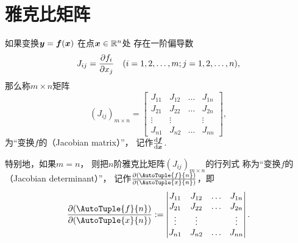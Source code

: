 \section{雅克比矩阵}
\begin{definition}
如果变换\(\boldsymbol{y} = \boldsymbol{f}(\boldsymbol{x})\)
在点\(\boldsymbol{x} \in \mathbb{R}^n\)处
存在一阶偏导数\[
	J_{ij} = \pdv{f_i}{x_j}
	\quad(i=1,2,\dotsc,m; j=1,2,\dotsc,n),
\]
那么称\(m \times n\)矩阵\[
	(J_{ij})_{m \times n}
	= \begin{bmatrix}
		J_{11} & J_{12} & \dots & J_{1n} \\
		J_{21} & J_{22} & \dots & J_{2n} \\
		\vdots & \vdots & & \vdots \\
		J_{n1} & J_{n2} & \dots & J_{nn}
	\end{bmatrix},
\]为“变换\(f\)的（Jacobian matrix）”，
记作\(\dv{\boldsymbol{f}}{\boldsymbol{x}}\).

特别地，如果\(m = n\)，
则把\(n\)阶雅克比矩阵\((J_{ij})_{m \times n}\)的行列式
称为“变换\(f\)的（Jacobian determinant）”，
记作\(\jacobi{\AutoTuple{f}{n}}{\AutoTuple{x}{n}}\)，即\[
	\jacobi{\AutoTuple{f}{n}}{\AutoTuple{x}{n}}
	\defeq \begin{vmatrix}
		J_{11} & J_{12} & \dots & J_{1n} \\
		J_{21} & J_{22} & \dots & J_{2n} \\
		\vdots & \vdots & & \vdots \\
		J_{n1} & J_{n2} & \dots & J_{nn}
	\end{vmatrix}.
\]
\end{definition}

